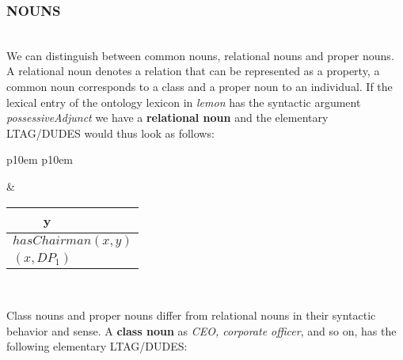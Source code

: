 
\subsubsection{NOUNS}\mbox{}\\
We can distinguish between common nouns, relational nouns and proper nouns. A relational noun denotes a relation that can be represented as a property, a common noun corresponds to a class and a proper noun to an individual. If the lexical entry of the ontology lexicon in \textit{lemon} has the syntactic argument \textit{possessiveAdjunct} we have a \textbf{relational noun} and the elementary LTAG/DUDES would thus look as follows: 

\medskip
\begin{center}
\begin{tabular}{ p{10em} p{10em} }
	\label{tbl:grammar.chairmanOf}
	
	\begin{center}
		\begin{tikzpicture}
		\Tree [.NP [.N chairman ] [.PP [.P of ] DP$_1\downarrow$ ] ]
		\end{tikzpicture}
	\end{center}
		
	&
	
	\begin{center}
		\begin{tabular}{|c|l|}
			\hline
			y & \mbox{}\\ 
			\hline
			\multicolumn{2}{|l|}{
				$hasChairman(x,y)$
			} \\
			\hline
			\multicolumn{2}{|l|}{
				$(x,DP_{1})$
			} \\
			\hline
		\end{tabular}
	\end{center}	
	\\
\end{tabular}
\end{center}
\medskip

Class nouns and proper nouns differ from relational nouns in their syntactic behavior and sense. A \textbf{class noun} as \textit{CEO, corporate officer}, and so on, has the following elementary LTAG/DUDES:

